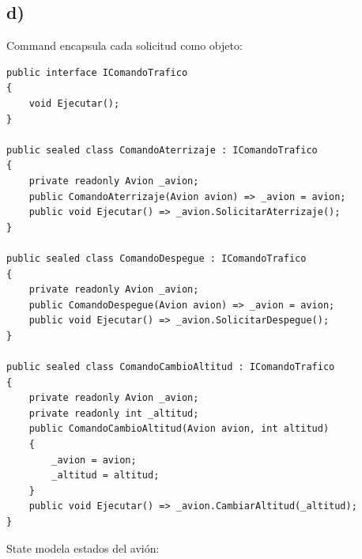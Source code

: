\documentclass[11pt,a4paper]{article}
\begin{document}
\subsection*{d)}

Command encapsula cada solicitud como objeto:

\begin{lstlisting}
public interface IComandoTrafico
{
    void Ejecutar();
}

public sealed class ComandoAterrizaje : IComandoTrafico
{
    private readonly Avion _avion;
    public ComandoAterrizaje(Avion avion) => _avion = avion;
    public void Ejecutar() => _avion.SolicitarAterrizaje();
}

public sealed class ComandoDespegue : IComandoTrafico
{
    private readonly Avion _avion;
    public ComandoDespegue(Avion avion) => _avion = avion;
    public void Ejecutar() => _avion.SolicitarDespegue();
}

public sealed class ComandoCambioAltitud : IComandoTrafico
{
    private readonly Avion _avion;
    private readonly int _altitud;
    public ComandoCambioAltitud(Avion avion, int altitud)
    {
        _avion = avion;
        _altitud = altitud;
    }
    public void Ejecutar() => _avion.CambiarAltitud(_altitud);
}
\end{lstlisting}

State modela estados del avión:
\end{document}
